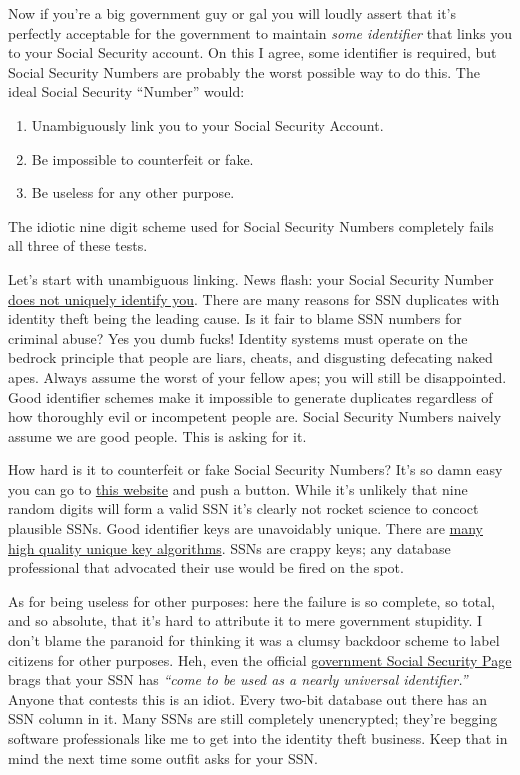 Now if you're a big government guy or gal you will loudly assert that
it's perfectly acceptable for the government to maintain \emph{some
identifier} that links you to your Social Security account. On this I
agree, some identifier is required, but Social Security Numbers are
probably the worst possible way to do this. The ideal Social Security
``Number'' would:

\begin{enumerate}
\itemsep1pt\parskip0pt
\item
  Unambiguously link you to your Social Security Account.
\item
  Be impossible to counterfeit or fake.
\item
  Be useless for any other purpose.
\end{enumerate}

The idiotic nine digit scheme used for Social Security Numbers
completely fails all three of these tests.

Let's start with unambiguous linking. News flash: your Social Security
Number
\href{http://www.dailyfinance.com/2010/08/12/your-social-security-number-may-not-be-unique-to-you/}{does
not uniquely identify you}. There are many reasons for SSN duplicates
with identity theft being the leading cause. Is it fair to blame SSN
numbers for criminal abuse? Yes you dumb fucks! Identity systems must
operate on the bedrock principle that people are liars, cheats, and
disgusting defecating naked apes. Always assume the worst of your fellow
apes; you will still be disappointed. Good identifier schemes make it
impossible to generate duplicates regardless of how thoroughly evil or
incompetent people are. Social Security Numbers naively assume we are
good people. This is asking for it.

How hard is it to counterfeit or fake Social Security Numbers? It's so
damn easy you can go to
\href{https://fakena.me/fake-social-security-number/}{this website} and
push a button. While it's unlikely that nine random digits will form a
valid SSN it's clearly not rocket science to concoct plausible SSNs.
Good identifier keys are unavoidably unique. There are
\href{http://en.wikipedia.org/wiki/Globally_unique_identifier}{many high
quality unique key algorithms}. SSNs are crappy keys; any database
professional that advocated their use would be fired on the spot.

As for being useless for other purposes: here the failure is so
complete, so total, and so absolute, that it's hard to attribute it to
mere government stupidity. I don't blame the paranoid for thinking it
was a clumsy backdoor scheme to label citizens for other purposes. Heh,
even the official
\href{http://www.ssa.gov/policy/docs/ssb/v69n2/v69n2p55.html}{government
Social Security Page} brags that your SSN has \emph{``come to be used as
a nearly universal identifier.''} Anyone that contests this is an idiot.
Every two-bit database out there has an SSN column in it. Many SSNs are
still completely unencrypted; they're begging software professionals
like me to get into the identity theft business. Keep that in mind the
next time some outfit asks for your SSN.

